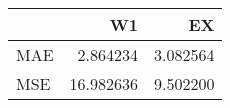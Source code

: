 \begin{tabular}{lrr}
\toprule
{} &         W1 &        EX \\
\midrule
MAE &   2.864234 &  3.082564 \\
MSE &  16.982636 &  9.502200 \\
\bottomrule
\end{tabular}
